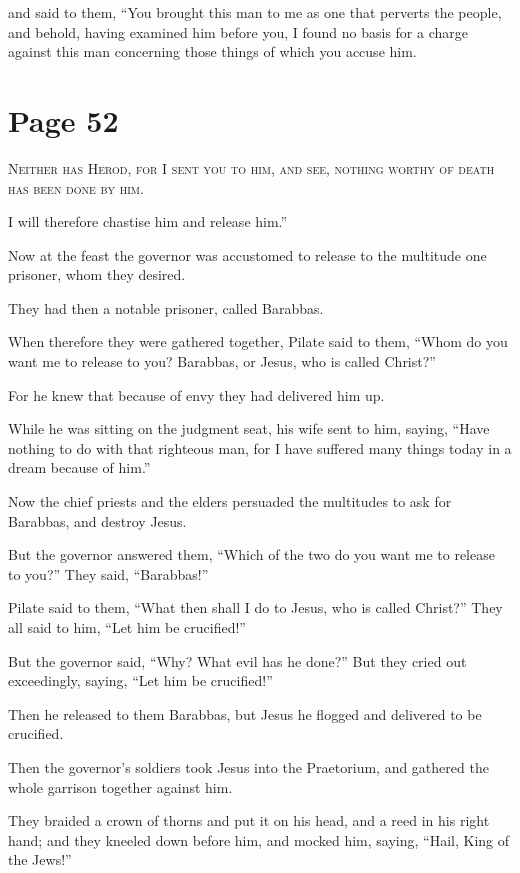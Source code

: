 and said to them, “You brought this man to me as one that perverts the people, and behold, having examined him before you, I found no basis for a charge against this man concerning those things of which you accuse him.



\chapterornament
\section*{Page 52}

\lettrine{N}{either has Herod, for I sent you to him, and see, nothing worthy of death has been done by him.}

I will therefore chastise him and release him.”

Now at the feast the governor was accustomed to release to the multitude one prisoner, whom they desired.

They had then a notable prisoner, called Barabbas.

When therefore they were gathered together, Pilate said to them, “Whom do you want me to release to you? Barabbas, or Jesus, who is called Christ?”

For he knew that because of envy they had delivered him up.

While he was sitting on the judgment seat, his wife sent to him, saying, “Have nothing to do with that righteous man, for I have suffered many things today in a dream because of him.”

Now the chief priests and the elders persuaded the multitudes to ask for Barabbas, and destroy Jesus.

But the governor answered them, “Which of the two do you want me to release to you?” They said, “Barabbas!”

Pilate said to them, “What then shall I do to Jesus, who is called Christ?” They all said to him, “Let him be crucified!”

But the governor said, “Why? What evil has he done?” But they cried out exceedingly, saying, “Let him be crucified!”

Then he released to them Barabbas, but Jesus he flogged and delivered to be crucified.

Then the governor’s soldiers took Jesus into the Praetorium, and gathered the whole garrison together against him.

They braided a crown of thorns and put it on his head, and a reed in his right hand; and they kneeled down before him, and mocked him, saying, “Hail, King of the Jews!”

